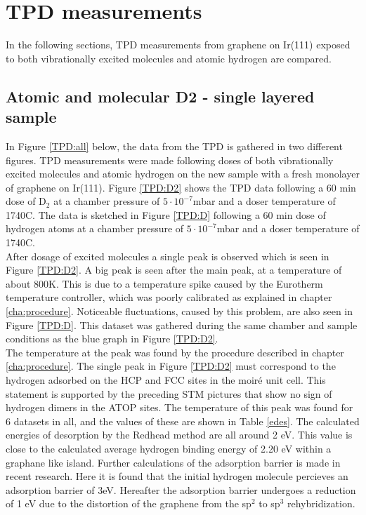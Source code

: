 \section{TPD measurements}
In the following sections, TPD measurements from graphene on Ir(111) exposed to both vibrationally excited molecules and atomic hydrogen are compared.

\subsection{Atomic and molecular D2 - single layered sample}

In Figure \ref{TPD:all} below, the data from the TPD is gathered in two different figures. TPD measurements were made following doses of both vibrationally excited molecules and atomic hydrogen on the new sample with a fresh monolayer of graphene on Ir(111). Figure \ref{TPD:D2} shows the TPD data following a 60 min dose of D$_2$ at a chamber pressure of $5\cdot 10^{-7}$mbar and a doser temperature of 1740\degree C. The data is sketched in Figure \ref{TPD:D} following a 60 min dose of hydrogen atoms at a chamber pressure of $5\cdot 10^{-7}$mbar and a doser temperature of 1740\degree C.\\
After dosage of excited molecules a single peak is observed which is seen in Figure \ref{TPD:D2}. A big peak is seen after the main peak, at a temperature of about 800K. This is due to a temperature spike caused by the Eurotherm temperature controller, which was poorly calibrated as explained in chapter \ref{cha:procedure}. Noticeable fluctuations, caused by this problem, are also seen in Figure \ref{TPD:D}. This dataset was gathered during the same chamber and sample conditions as the blue graph in Figure \ref{TPD:D2}.\\
The temperature at the peak was found by the procedure described in chapter \ref{cha:procedure}. The single peak in Figure \ref{TPD:D2} must correspond to the hydrogen adsorbed on the HCP and FCC sites in the moiré unit cell. This statement is supported by the preceding STM pictures that show no sign of hydrogen dimers in the ATOP sites. The temperature of this peak was found for 6 datasets in all, and the values of these are shown in Table \ref{edes}. The calculated energies of desorption by the Redhead method are all around 2 eV. This value is close to the calculated average hydrogen binding energy of 2.20 eV\cite{balog2013controlling} within a graphane like island. Further calculations of the adsorption barrier is made in recent research. Here it is found that the initial hydrogen molecule percieves an adsorption barrier of 3eV. Hereafter the adsorption barrier undergoes a reduction of 1 eV due to the distortion of the graphene from the sp$^2$ to sp$^3$ rehybridization.\\
